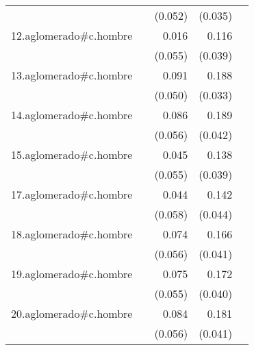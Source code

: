 {\begin{longtable}{l*{4}{D{.}{.}{-1}}}
            &                     &     (0.052)         &     (0.035)         &                     \\
\addlinespace
12.aglomerado#c.hombre&                     &       0.016         &       0.116\sym{**} &                     \\
            &                     &     (0.055)         &     (0.039)         &                     \\
\addlinespace
13.aglomerado#c.hombre&                     &       0.091         &       0.188\sym{***}&                     \\
            &                     &     (0.050)         &     (0.033)         &                     \\
\addlinespace
14.aglomerado#c.hombre&                     &       0.086         &       0.189\sym{***}&                     \\
            &                     &     (0.056)         &     (0.042)         &                     \\
\addlinespace
15.aglomerado#c.hombre&                     &       0.045         &       0.138\sym{***}&                     \\
            &                     &     (0.055)         &     (0.039)         &                     \\
\addlinespace
17.aglomerado#c.hombre&                     &       0.044         &       0.142\sym{**} &                     \\
            &                     &     (0.058)         &     (0.044)         &                     \\
\addlinespace
18.aglomerado#c.hombre&                     &       0.074         &       0.166\sym{***}&                     \\
            &                     &     (0.056)         &     (0.041)         &                     \\
\addlinespace
19.aglomerado#c.hombre&                     &       0.075         &       0.172\sym{***}&                     \\
            &                     &     (0.055)         &     (0.040)         &                     \\
\addlinespace
20.aglomerado#c.hombre&                     &       0.084         &       0.181\sym{***}&                     \\
            &                     &     (0.056)         &     (0.041)         &                     \\

\end{longtable}}
